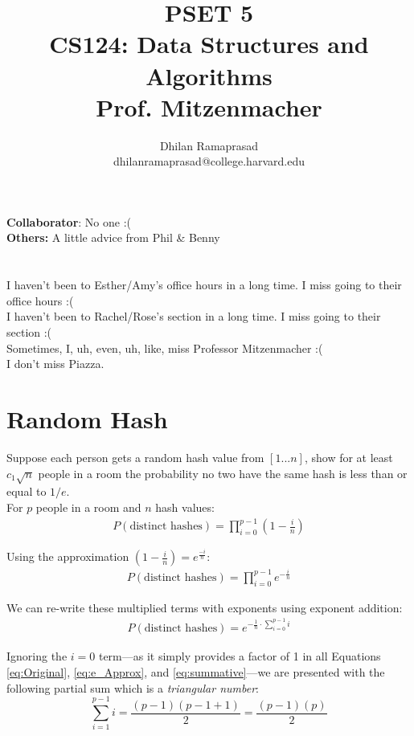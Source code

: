 \documentclass[conference]{styles/acmsiggraph}
\title{\huge PSET 5 \\ \LARGE {CS124: Data Structures and Algorithms \\ Prof. Mitzenmacher}}
\author{\Large Dhilan Ramaprasad \\ dhilanramaprasad@college.harvard.edu}
\newcommand{\?}{\stackrel{?}{=}}
\begin{document}
\maketitle

\textbf{Collaborator}: No one :( \\
\textbf{Others:} A little advice from Phil \& Benny \\
\\ \\
I haven't been to Esther/Amy's office hours in a long time.  I miss going to their office hours :( \\
I haven't been to Rachel/Rose's section in a long time.  I miss going to their section :( \\

Sometimes, I, uh, even, uh, like, miss Professor Mitzenmacher :( \\

I don't miss Piazza.

\newpage

\section{Random Hash}
Suppose each person gets a random hash value from $[1...n]$, show for at least $c_1 \sqrt{n}$ people in a room the probability no two have the same hash is less than or equal to $1/e$. \\

For $p$ people in a room and $n$ hash values:
\begin{align} \label{eq:Original}
    P(\text{distinct hashes}) = \prod_{i=0}^{p-1} \left ( 1- \frac{i}{n} \right )
\end{align}

Using the approximation $\left ( 1- \frac{i}{n} \right ) = e^{\frac{-i}{n}}$:
\begin{align} \label{eq:e_Approx}
    P(\text{distinct hashes}) = \prod_{i=0}^{p-1} e^{-\frac{i}{n}}
\end{align}

We can re-write these multiplied terms with exponents using exponent addition:
\begin{align}\label{eq:summative}
    P(\text{distinct hashes}) = e^{-\frac{1}{n} \cdot \sum_{i=0}^{p-1} i}
\end{align}

Ignoring the $i=0$ term---as it simply provides a factor of 1 in all Equations \ref{eq:Original}, \ref{eq:e_Approx}, and \ref{eq:summative}---we are presented with the following partial sum which is a \textit{triangular number}:
$$\sum_{i=1}^{p-1} i = \frac{(p-1)(p-1 + 1)}{2} = \frac{(p-1)(p)}{2}$$
\end{document}
